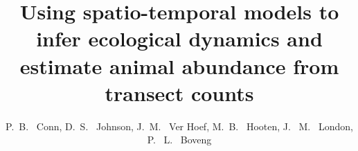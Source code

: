 \documentclass[times,mee,doublespace,]{besauth2}
\begin{document}


\title{Using spatio-temporal models to infer ecological dynamics and estimate animal abundance from transect counts} %

\author{P.~B. ~Conn\corrauth, D.~S. ~Johnson, J.~M. ~Ver Hoef, M.~B. ~Hooten,  J. ~M. ~London, P. ~L. ~Boveng}


\address{National Marine Mammal Laboratory, Alaska Fisheries Science Center, NOAA National Marine Fisheries Service, 7600 Sand Point Way NE, Seattle, WA 98115 USA;U.S. Geological Survey, Colorado Cooperative Fish and Wildlife Research Unit, Colorado State University, Fort Collins, CO 80523 USA; Department of Fish, Wildlife, and Conservation Biology, Colorado State University, Fort Collins, CO 80523 USA;Department of Statistics, Colorado State University, Fort Collins, CO 80523 USA}

\end{document}

